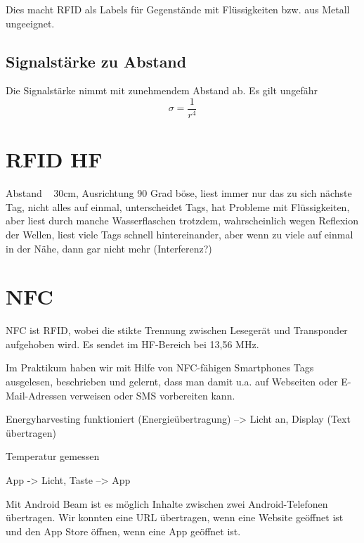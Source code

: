 \documentclass[paper=a4,fontsize=11pt,headsepline,footsepline,parskip=half]{scrartcl}
\begin{document}
Dies macht RFID als Labels für Gegenstände mit Flüssigkeiten bzw. aus Metall ungeeignet.

\subsection{Signalstärke zu Abstand}

Die Signalstärke nimmt mit zunehmendem Abstand ab. Es gilt ungefähr
$$\sigma = \frac{1}{r^4}$$

\section{RFID HF}

Abstand ~ 30cm, Ausrichtung 90 Grad böse, liest immer nur das zu sich nächste Tag, nicht alles auf einmal, unterscheidet Tags, hat
Probleme mit Flüssigkeiten, aber liest durch manche Wasserflaschen trotzdem, wahrscheinlich wegen Reflexion der Wellen, liest viele 
Tags schnell hintereinander, aber wenn zu viele auf einmal in der Nähe, dann gar nicht mehr (Interferenz?)

\section{NFC}

NFC ist RFID, wobei die stikte Trennung zwischen Lesegerät und Transponder aufgehoben wird. Es sendet im HF-Bereich bei 13,56 MHz.

Im Praktikum haben wir mit Hilfe von NFC-fähigen Smartphones Tags ausgelesen, beschrieben und gelernt, dass man damit u.a.
auf Webseiten oder E-Mail-Adressen verweisen oder SMS vorbereiten kann.

Energyharvesting funktioniert (Energieübertragung) --> Licht an, Display (Text übertragen)

Temperatur gemessen

App -> Licht, Taste --> App

Mit Android Beam ist es möglich Inhalte zwischen zwei Android-Telefonen übertragen.
Wir konnten eine URL übertragen, wenn eine Website geöffnet ist und den App Store
öffnen, wenn eine App geöffnet ist.
\end{document}
